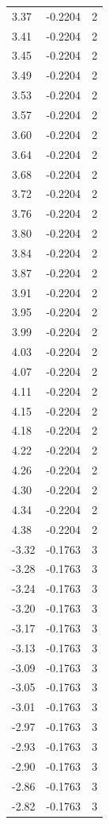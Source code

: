\begin{longtable}{lrr}
  3.37 & -0.2204 & 2 \\
  3.41 & -0.2204 & 2 \\
  3.45 & -0.2204 & 2 \\
  3.49 & -0.2204 & 2 \\
  3.53 & -0.2204 & 2 \\
  3.57 & -0.2204 & 2 \\
  3.60 & -0.2204 & 2 \\
  3.64 & -0.2204 & 2 \\
  3.68 & -0.2204 & 2 \\
  3.72 & -0.2204 & 2 \\
  3.76 & -0.2204 & 2 \\
  3.80 & -0.2204 & 2 \\
  3.84 & -0.2204 & 2 \\
  3.87 & -0.2204 & 2 \\
  3.91 & -0.2204 & 2 \\
  3.95 & -0.2204 & 2 \\
  3.99 & -0.2204 & 2 \\
  4.03 & -0.2204 & 2 \\
  4.07 & -0.2204 & 2 \\
  4.11 & -0.2204 & 2 \\
  4.15 & -0.2204 & 2 \\
  4.18 & -0.2204 & 2 \\
  4.22 & -0.2204 & 2 \\
  4.26 & -0.2204 & 2 \\
  4.30 & -0.2204 & 2 \\
  4.34 & -0.2204 & 2 \\
  4.38 & -0.2204 & 2 \\
  -3.32 & -0.1763 & 3 \\
  -3.28 & -0.1763 & 3 \\
  -3.24 & -0.1763 & 3 \\
  -3.20 & -0.1763 & 3 \\
  -3.17 & -0.1763 & 3 \\
  -3.13 & -0.1763 & 3 \\
  -3.09 & -0.1763 & 3 \\
  -3.05 & -0.1763 & 3 \\
  -3.01 & -0.1763 & 3 \\
  -2.97 & -0.1763 & 3 \\
  -2.93 & -0.1763 & 3 \\
  -2.90 & -0.1763 & 3 \\
  -2.86 & -0.1763 & 3 \\
  -2.82 & -0.1763 & 3 \\

\end{longtable}
